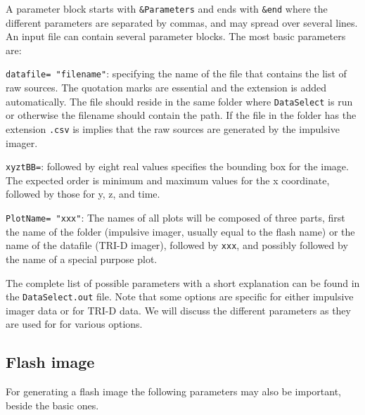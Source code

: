 A parameter block starts with \verb!&Parameters! and ends with \verb!&end! where the different parameters are separated by commas, and may spread over several lines. An input file can contain several parameter blocks. The most basic parameters are:
\begin{enumerate*}
\item \verb!datafile= "filename"!: specifying the name of the file that contains the list of raw sources. The quotation marks are essential and the extension is added automatically. The file should reside in the same folder where \verb!DataSelect! is run or otherwise the filename should contain the path. If the file in the folder has the extension \verb!.csv! is implies that the raw sources are generated by the impulsive imager.
\item \verb!xyztBB=!: followed by eight real values specifies the bounding box for the image. The expected order is minimum and maximum values for the x coordinate, followed by those for y, z, and time.
\item \verb!PlotName= "xxx"!: The names of all plots will be composed of three parts, first the name of the folder (impulsive imager, usually equal to the flash name) or the name of the datafile (TRI-D imager), followed by \verb!xxx!, and possibly followed by the name of a special purpose plot.
\end{enumerate*}
The complete list of possible parameters with a short explanation can be found in the \verb!DataSelect.out! file. Note that some options are specific for either impulsive imager data or for TRI-D data. We will discuss the different parameters as they are used for for various options.

\subsection{Flash image}

For generating a flash image the following parameters may also be important, beside the basic ones.


